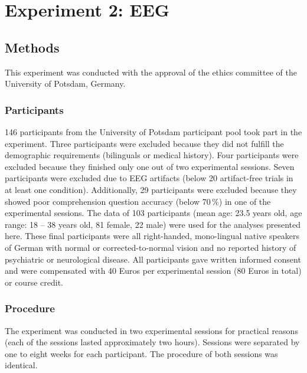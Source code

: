 \documentclass[a4paper, man, floatsintext]{apa7}
\begin{document}

\clearpage
\section{Experiment 2: EEG}
\subsection{Methods}
This experiment was conducted with the approval of the ethics committee of the University of Potsdam, Germany.

\subsubsection{Participants}
146 participants from the University of Potsdam participant pool took part in the experiment. Three participants were excluded because they did not fulfill the demographic requirements (bilinguals or medical history). Four participants were excluded because they finished only one out of two experimental sessions. Seven participants were excluded due to EEG artifacts (below 20 artifact-free trials in at least one condition). Additionally, 29 participants were excluded because they showed poor comprehension question accuracy (below 70\,\%) in one of the experimental sessions. The data of 103 participants (mean age: 23.5 years old, age range: 18 -- 38 years old, 81 female, 22 male) were used for the analyses presented here. These final participants were all right-handed, mono-lingual native speakers of German with normal or corrected-to-normal vision and no reported history of psychiatric or neurological disease. All participants gave written informed consent and were compensated with 40 Euros per experimental session (80 Euros in total) or course credit.

\subsubsection{Procedure}
The experiment was conducted in two experimental sessions for practical reasons (each of the sessions lasted approximately two hours). Sessions were separated by one to eight weeks for each participant. The procedure of both sessions was identical.
\end{document}
